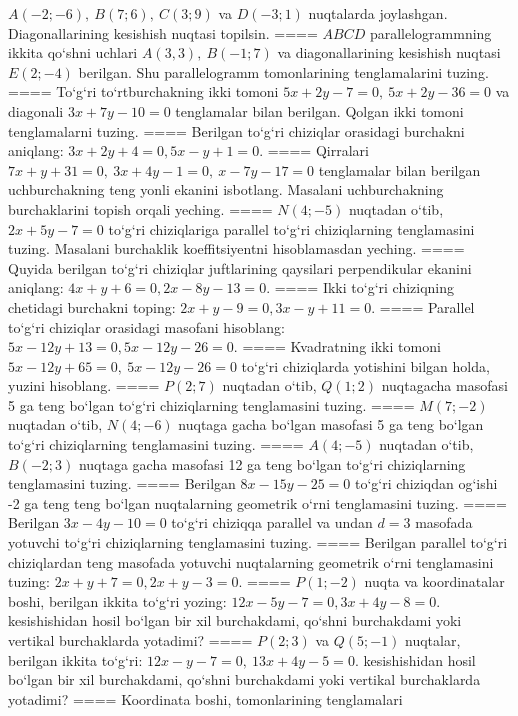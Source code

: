 \(A (-2;-6),\ B (7;6),\ C (3;9) \) va \(D (-3;1) \) nuqtalarda
joylashgan. Diagonallarining kesishish nuqtasi topilsin.
====
$ABCD$ parallelogrammning ikkita qo‘shni uchlari
\(A (3,3),\ B (-1;7) \) va diagonallarining kesishish nuqtasi
\(E (2;-4) \) berilgan. Shu parallelogramm tomonlarining tenglamalarini
tuzing.
====
To‘g‘ri to‘rtburchakning ikki tomoni
\(5x+2y-7=0,\ 5x+2y-36=0\) va diagonali
\(3x+7y-10=0\) tenglamalar bilan berilgan. Qolgan ikki tomoni
tenglamalarni tuzing.
====
Berilgan to‘g‘ri chiziqlar orasidagi burchakni aniqlang: $3x+2y+4=0, 5x-y+1=0$.
====
Qirralari
\(7x+y+31=0,\ 3x+4y-1=0,\ x-7y-17=0\) tenglamalar
bilan berilgan uchburchakning teng yonli ekanini isbotlang.
Masalani uchburchakning
burchaklarini topish orqali yeching.
====
\(N (4;-5) \) nuqtadan o‘tib, $2x+5y-7=0$
to‘g‘ri chiziqlariga parallel to‘g‘ri chiziqlarning tenglamasini tuzing. Masalani burchaklik
koeffitsiyentni hisoblamasdan yeching.
====
Quyida berilgan to‘g‘ri chiziqlar juftlarining qaysilari
perpendikular ekanini aniqlang: $4x+y+6=0, 2x-8y-13=0$.
====
Ikki to‘g‘ri chiziqning chetidagi burchakni toping: $2x+y-9=0, 3x-y+11=0$.
====
Parallel to‘g‘ri chiziqlar orasidagi masofani hisoblang: $5x-12y+13=0, 5x-12y-26=0$.
====
Kvadratning ikki tomoni
\(5x-12y+65=0,\ 5x-12y-26=0\) to‘g‘ri chiziqlarda
yotishini bilgan holda, yuzini hisoblang.
====
\(P (2;7) \) nuqtadan o‘tib, \(Q (1;2) \) nuqtagacha
masofasi 5 ga teng bo‘lgan to‘g‘ri chiziqlarning tenglamasini tuzing.
====
\(M (7;-2) \) nuqtadan o‘tib, \(N (4;-6) \) nuqtaga
gacha bo‘lgan masofasi 5 ga teng bo‘lgan to‘g‘ri chiziqlarning tenglamasini tuzing.
====
\(A (4;-5) \) nuqtadan o‘tib, \(B (-2;3) \) nuqtaga
gacha masofasi 12 ga teng bo‘lgan to‘g‘ri chiziqlarning tenglamasini tuzing.
====
Berilgan \(8x-15y-25=0\) to‘g‘ri chiziqdan og‘ishi -2 ga teng
teng bo‘lgan nuqtalarning geometrik o‘rni tenglamasini tuzing.
====
Berilgan \(3x-4y-10=0\) to‘g‘ri chiziqqa parallel va undan
$d=3$ masofada yotuvchi to‘g‘ri chiziqlarning tenglamasini tuzing.
====
Berilgan parallel to‘g‘ri chiziqlardan teng masofada yotuvchi
nuqtalarning geometrik o‘rni tenglamasini tuzing: $2x+y+7=0, 2x+y-3=0$.
====
\(P (1;-2) \) nuqta va koordinatalar boshi, berilgan ikkita
to‘g‘ri yozing: $12x-5y-7=0, 3x+4y-8=0$.
kesishishidan hosil bo‘lgan bir xil burchakdami, qo‘shni burchakdami yoki vertikal
burchaklarda yotadimi?
====
\(P (2;3) \) va \(Q (5;-1) \) nuqtalar, berilgan ikkita
to‘g‘ri: $12x-y-7=0,\ 13x+4y-5=0$.
kesishishidan hosil bo‘lgan bir xil burchakdami, qo‘shni burchakdami yoki vertikal
burchaklarda yotadimi?
====
Koordinata boshi, tomonlarining tenglamalari
